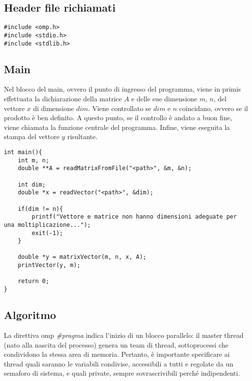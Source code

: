 \subsection{Header file richiamati}
\begin{lstlisting}
#include <omp.h>
#include <stdio.h>
#include <stdlib.h>
\end{lstlisting}

\subsection{Main}
Nel blocco del main, ovvero il punto di ingresso del programma, viene in primis effettuata la dichiarazione della matrice $A$ e delle sue dimensione $m$, $n$, del vettore $x$ di dimensione $dim$.
Viene controllato se $dim$ e $n$ coincidano, ovvero se il prodotto è ben definito.
A questo punto, se il controllo è andato  a buon fine, viene chiamata la funzione centrale del programma.
Infine, viene eseguita la stampa del vettore $y$ risultante.

\begin{lstlisting}
int main(){
    int m, n;
    double **A = readMatrixFromFile("<path>", &m, &n);

    int dim;
    double *x = readVector("<path>", &dim);

    if(dim != n){
        printf("Vettore e matrice non hanno dimensioni adeguate per una moltiplicazione...");
        exit(-1);
    }
    
    double *y = matrixVector(m, n, x, A);
    printVector(y, m);

    return 0;
}
\end{lstlisting}

\subsection{Algoritmo}
La direttiva omp \textit{\#pragma} indica l'inizio di un blocco parallelo: il master thread (nato alla nascita del processo) genera un team di thread, sottoprocessi che condividono la stessa area di memoria. Pertanto, è importante specificare ai thread quali saranno le variabili condivise, accessibili a tutti e regolate da un semaforo di sistema, e quali private, sempre sovrascrivibili perché indipendenti. 

